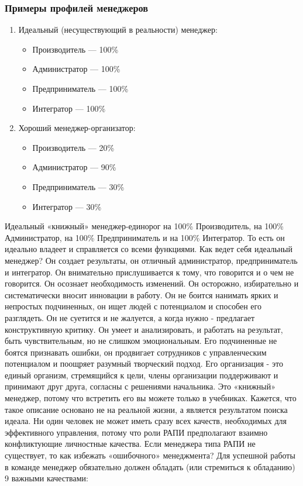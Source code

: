\documentclass{../industrial-development}
\begin{document}
\begin{frame} \frametitle{Примеры профилей менеджеров }
	\begin{enumerate}
\item Идеальный (несуществующий в реальности) менеджер: 
		 \begin{itemize}
                     \item Производитель — 100\%
 		 \item Администратор — 100\%
 		 \item Предприниматель — 100\%
		\item Интегратор — 100\%
		\end{itemize} 
\item Хороший менеджер-организатор:	
		 \begin{itemize}
                         \item Производитель — 20\%
 		 \item Администратор — 90\%
 		 \item Предприниматель — 30\%
		\item Интегратор — 30\%
		\end{itemize} 
\end{enumerate}
\end{frame}
\lecturenotes
Идеальный «книжный» менеджер-единорог на 100\% Производитель, на 100\% Администратор, на 100\% Предприниматель и на 100\% Интегратор. То есть он идеально владеет и справляется со всеми функциями.
Как ведет себя идеальный менеджер? Он создает результаты, он отличный администратор, предприниматель и интегратор. Он внимательно прислушивается к тому, что говорится и о чем не говорится. Он осознает необходимость изменений. Он осторожно, избирательно и систематически вносит инновации в работу. Он не боится нанимать ярких и непростых подчиненных, он ищет людей с потенциалом и способен его разглядеть. Он не суетится и не жалуется, а когда нужно - предлагает конструктивную критику. Он умеет и анализировать, и работать на результат, быть чувствительным, но не слишком эмоциональным. Его подчиненные не боятся признавать ошибки, он продвигает сотрудников с управленческим потенциалом и поощряет разумный творческий подход. Его организация - это единый организм, стремящийся к цели, члены организации поддерживают и принимают друг друга, согласны с решениями начальника.
Это «книжный» менеджер, потому что встретить его вы можете только в учебниках. Кажется, что такое описание основано не на реальной жизни, а является результатом поиска идеала. Ни один человек не может иметь сразу всех качеств, необходимых для эффективного управления, потому что роли РАПИ предполагают взаимно конфликтующие личностные качества.
Если менеджера типа РАПИ не существует, то как избежать «ошибочного» менеджмента? Для успешной работы в команде менеджер обязательно должен обладать (или стремиться к обладанию) 9  важными качествами:
\end{document}
